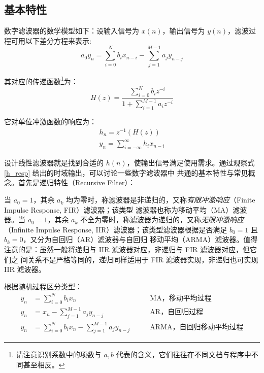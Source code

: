 \subsection{基本特性}
数字滤波器的数学模型如下：设输入信号为 $x(n)$，输出信号为 $y(n)$，滤波过程可用以下差分方程来表示\cite{scipy_docs_filtering}:
\begin{equation}
    \label{flt_time_domain}
    a_0y_{n}=\sum_{i=0}^{N} b_{i} x_{n-i}-\sum_{j=1}^{M-1} a_{j} y_{n-j}
\end{equation}

其对应的传递函数\footnote[1]{请注意识别系数中的项数与 $a,b$ 代表的含义，它们往往在不同文档与程序中不同甚至相反。}为：
\begin{equation}
    H(z)=\frac{\sum\limits_{i=0}^{N} b_iz^{-i}}{1+\sum\limits_{i=1}^{M-1} a_iz^{-i}}
\end{equation}

它对单位冲激函数的响应为：
\begin{equation}
    \begin{split}
        \label{h_resp}
        h_n=z^{-1}(H(z))\\
        y_n=\sum_{i=-\infty}^{\infty} h_ix_{n-i}
    \end{split}
\end{equation}

设计线性滤波器就是找到合适的 $h(n)$，使输出信号满足使用需求。通过观察式 \eqref{h_resp} 给出的时域输出，可以讨论一些数字滤波器中
共通的基本特性与常见概念。首先是递归特性（Recursive Filter）：

当 $a_0=1$，其余 $a_k$ 均为零时，称滤波器是非递归的，又称\emph{有限冲激响应}（Finite Impulse Response, FIR）滤波器；该类型
滤波器也称为移动平均（MA）滤波器。当 $a_0 = 1$，其余 $a_k$ 不全为零时，称滤波器为递归的，又称\emph{无限冲激响应}（Infinite
Impulse Response, IIR）滤波器；该类型滤波器根据是否满足 $b_0 = 1$ 且 $b_k = 0$，又分为自回归（AR）滤波器与自回归
移动平均（ARMA）滤波器\cite{hamilton2020time}。值得注意的是：虽然一般将递归与 IIR 滤波器对应，非递归与 FIR 滤波器对应，但它们之
间关系不是严格等同的，递归同样适用于 FIR 滤波器实现，非递归也可实现 IIR 滤波器。
\begin{tcolorbox}
    \textrm{根据随机过程区分类型：}
    \begin{align*}
        y_{n} & =\sum_{i=0}^{N} b_{i} x_{n}\qquad                                & \textrm{MA，移动平均过程}      \\
        y_{n} & =x_{n}-\sum_{j=1}^{M-1} a_{j} y_{n-j}\qquad                      & \textrm{AR，自回归过程}       \\
        y_{n} & =\sum_{i=0}^{N} b_{i} x_{n}-\sum_{j=1}^{M-1} a_{j} y_{n-j}\qquad & \textrm{ARMA，自回归移动平均过程}
    \end{align*}
\end{tcolorbox}


